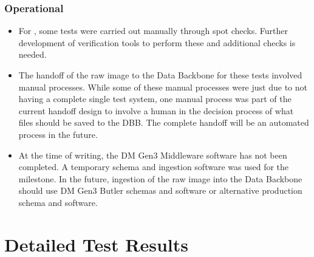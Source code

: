 \documentclass[DM,lsstdraft,STR,toc]{lsstdoc}
\begin{document}
\subsubsection{Operational}

\begin{itemize}
  \item{For \milestoneId{}, some tests were carried out manually through spot checks.
    Further development of verification tools to perform these and additional checks is needed.  }
  \item{The handoff of the raw image to the Data Backbone for these tests involved manual processes.  While some of these manual processes
 were just due to not having a complete single test system, one manual process was part of the current handoff design to involve a human in the
decision process of what files should be saved to the DBB.   The complete handoff will be an automated process in the future.}
  \item{At the time of writing, the DM Gen3 Middleware software has not been
        completed.   A temporary schema and ingestion software was used for the milestone.
        In the future, ingestion of the raw image into the Data Backbone should use DM Gen3
        Butler schemas and software or alternative production schema and software.}
\end{itemize}


\newpage

\section{Detailed Test Results}
\label{sect:detailed}
\end{document}
